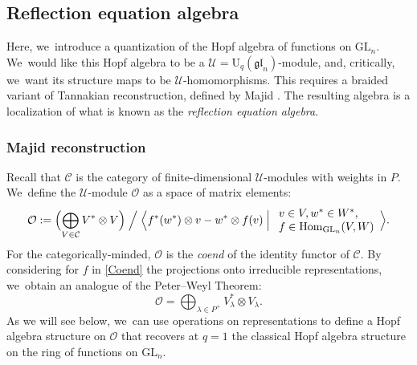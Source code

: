 \documentclass[11pt]{article}
\newcommand{\GL}{\mathrm{GL}}
\newcommand{\rU}{\mathrm{U}}
\theoremstyle{definition}
\newcommand{\OO}{\mathcal{O}}
\newcommand{\UU}{\mathcal{U}}
\begin{document}
\subsection{Reflection equation algebra}
Here, we~introduce a quantization of the Hopf algebra of functions on $\GL_n$. We~would like this Hopf algebra to be a $\mathcal{U}=\rU_q(\mathfrak{gl}_n)$-module, and, critically, we~want its structure maps to be $\UU$-homomorphisms.
This requires a braided variant of Tannakian reconstruction, defined by Majid \cite{MajidBraided}.
The resulting algebra is a localization of what is known as the \textit{reflection equation algebra}.

\subsubsection{Majid reconstruction}
Recall that $\mathcal{C}$ is the category of finite-dimensional $\UU$-modules with weights in $P$. We~define the $\UU$-module $\OO$ as a space of matrix elements:
\begin{equation}
\OO:=\Bigl(\bigoplus_{V\in\mathcal{C}}V^*\otimes V \Bigr)\Bigm/\Bigl\langle f^*(w^*)\otimes v-w^*\otimes f(v)\Bigm|
\begin{array}{l}
v\in V, w^*\in W^*,\\
f\in\mathrm{Hom}_{\GL_n}(V,W)
\end{array}
\Bigr\rangle.
\label{Coend}
\end{equation}
For the categorically-minded, $\OO$ is the \textit{coend} of the identity functor of $\mathcal{C}$.
By considering for $f$ in \eqref{Coend} the projections onto irreducible representations, we~obtain an analogue of the Peter--Weyl Theorem:
\begin{equation}
\OO=\bigoplus_{\lambda\in P^+} V_\lambda^*\otimes V_\lambda.
\label{qPeterWeyl}
\end{equation}
As we will see below, we~can use operations on representations to define a Hopf algebra structure on $\OO$ that recovers at $q=1$ the classical Hopf algebra structure on the ring of functions on $\GL_n$.
\end{document}
